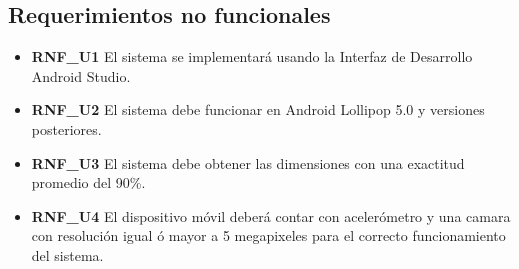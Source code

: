 \subsection{Requerimientos no funcionales}

\begin{itemize}
\item \textbf{RNF\_U1} El sistema se implementará usando la Interfaz de Desarrollo Android Studio.
\item \textbf{RNF\_U2} El sistema debe funcionar en Android Lollipop 5.0 y versiones posteriores.
\item \textbf{RNF\_U3} El sistema debe obtener las dimensiones con una exactitud promedio del 90\%.
\item \textbf{RNF\_U4} El dispositivo móvil deberá contar con acelerómetro y una camara con resolución igual ó mayor a 5 megapixeles para el correcto funcionamiento del sistema.

\end{itemize}